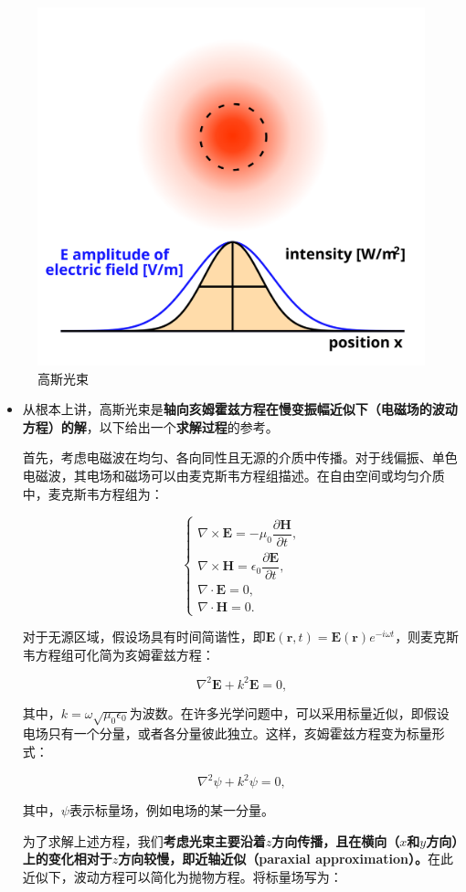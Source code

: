 \begin{enumerate}
\begin{enumerate}
		\begin{figure}[h]
			\centering
			\includegraphics[width=0.35\linewidth]{images/APL1_8_Laser_gaussian_profile}
			\caption{高斯光束}
			\label{fig:apl18lasergaussianprofile}
		\end{figure}
		
		\begin{itemize}
			\item 从根本上讲，高斯光束是\textbf{轴向亥姆霍兹方程在慢变振幅近似下（电磁场的波动方程）的解}，以下给出一个\textbf{求解过程}的参考。
			
			首先，考虑电磁波在均匀、各向同性且无源的介质中传播。对于线偏振、单色电磁波，其电场和磁场可以由麦克斯韦方程组描述。在自由空间或均匀介质中，麦克斯韦方程组为：
			
			\[
			\begin{cases}
				\nabla \times \mathbf{E} = -\mu_0 \dfrac{\partial \mathbf{H}}{\partial t}, \\
				\nabla \times \mathbf{H} = \epsilon_0 \dfrac{\partial \mathbf{E}}{\partial t}, \\
				\nabla \cdot \mathbf{E} = 0, \\
				\nabla \cdot \mathbf{H} = 0.
			\end{cases}
			\]
			
			对于无源区域，假设场具有时间简谐性，即\(\mathbf{E}(\mathbf{r}, t) = \mathbf{E}(\mathbf{r}) e^{-i\omega t}\)，则麦克斯韦方程组可化简为亥姆霍兹方程：
			
			\[
			\nabla^2 \mathbf{E} + k^2 \mathbf{E} = 0,
			\]
			
			其中，\(k = \omega \sqrt{\mu_0 \epsilon_0}\)为波数。在许多光学问题中，可以采用标量近似，即假设电场只有一个分量，或者各分量彼此独立。这样，亥姆霍兹方程变为标量形式：
			
			\[
			\nabla^2 \psi + k^2 \psi = 0,
			\]
			
			其中，\(\psi\)表示标量场，例如电场的某一分量。
			
			为了求解上述方程，我们\textbf{考虑光束主要沿着\(z\)方向传播，且在横向（\(x\)和\(y\)方向）上的变化相对于\(z\)方向较慢，即近轴近似（paraxial approximation）。}在此近似下，波动方程可以简化为抛物方程。将标量场写为：
			

\end{itemize}
\end{enumerate}
\end{enumerate}
